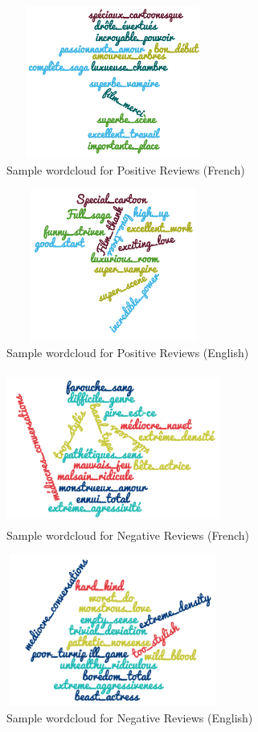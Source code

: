 \documentclass[conference]{IEEEtran}
\begin{document}
\begin{figure}[H]
\centering
\caption{Sample wordcloud for Positive Reviews (French)}
\includegraphics[width=7cm, height=5cm]{positive.png}
\end{figure}
\begin{figure}[H]
\centering
\caption{Sample wordcloud for Positive Reviews (English)}
\includegraphics[width=7cm, height=5cm]{positive_en.png}
\end{figure}
\begin{figure}[H]
\centering
\caption{Sample wordcloud for Negative Reviews (French)}
\includegraphics[width=7cm, height=5cm]{negative.png}
\end{figure}
\begin{figure}[H]
\centering
\caption{Sample wordcloud for Negative Reviews (English)}
\includegraphics[width=7cm, height=5cm]{negative_en.png}
\end{figure}
\end{document}
